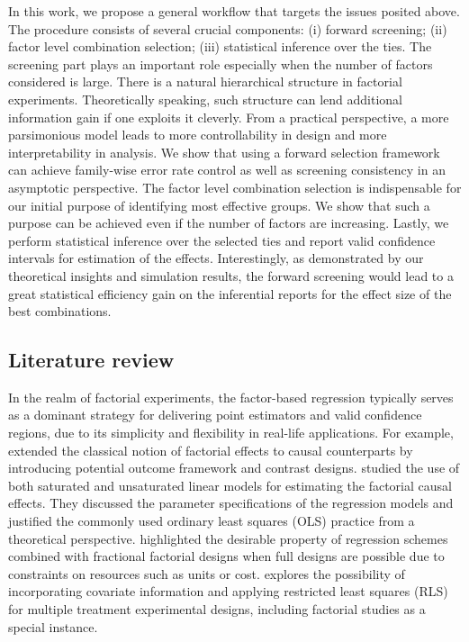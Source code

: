 \documentclass[12pt]{article}
\begin{document}
In this work, we propose a general workflow that targets the issues posited above. The procedure consists of several crucial components: (i) forward  screening; (ii) factor level combination selection; (iii) statistical inference over the ties. The  screening part plays an important role especially when the number of factors considered is large. There is a natural hierarchical structure in factorial experiments. Theoretically speaking, such structure can lend additional information gain if one exploits it cleverly. From a practical perspective, a more parsimonious model leads to more controllability in design and more interpretability in analysis. We show that using a forward selection framework can achieve family-wise error rate control as well as  screening consistency in an asymptotic perspective. The factor level combination selection is indispensable for our initial purpose of identifying most effective groups. We show that such a purpose can be achieved even if the number of factors are increasing. Lastly, we perform statistical inference over the selected ties and report valid confidence intervals for estimation of the effects. Interestingly, as demonstrated by our theoretical insights and simulation results, the forward  screening would lead to a great statistical efficiency gain on the inferential reports for the effect size of the best combinations.



\subsection{Literature review}
In the realm of factorial experiments, the factor-based regression typically serves as a dominant strategy for delivering point estimators and valid confidence regions, due to its simplicity and flexibility in real-life applications. For example, \cite{dasgupta2015causal} extended the classical notion of factorial effects to causal counterparts by introducing potential outcome framework and contrast designs.  \cite{zhao2021regression} studied the use of both saturated and unsaturated linear models for estimating the factorial causal effects. They discussed the parameter specifications of the regression models and  justified the commonly used ordinary least squares (OLS) practice from a theoretical perspective.  \cite{pashley2019causal} highlighted the desirable property of regression schemes combined with fractional factorial designs when full designs are possible due to constraints on resources such as units or cost. \cite{zhao2021covariate} explores the possibility of incorporating covariate information and applying restricted least squares (RLS) for multiple treatment experimental designs, including factorial studies as a special instance. 
\end{document}
